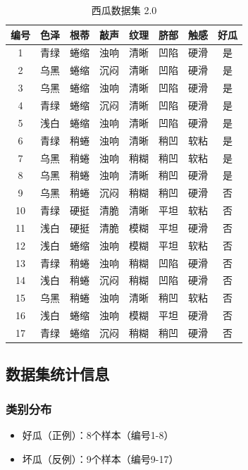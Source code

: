\documentclass[12pt,a4paper]{ctexart}
\begin{document}
\begin{table}[H]
\centering
\caption{西瓜数据集 2.0}
\begin{tabular}{cccccccc}
\toprule
\textbf{编号} & \textbf{色泽} & \textbf{根蒂} & \textbf{敲声} & \textbf{纹理} & \textbf{脐部} & \textbf{触感} & \textbf{好瓜} \\
\midrule
1 & 青绿 & 蜷缩 & 浊响 & 清晰 & 凹陷 & 硬滑 & 是 \\
2 & 乌黑 & 蜷缩 & 沉闷 & 清晰 & 凹陷 & 硬滑 & 是 \\
3 & 乌黑 & 蜷缩 & 浊响 & 清晰 & 凹陷 & 硬滑 & 是 \\
4 & 青绿 & 蜷缩 & 沉闷 & 清晰 & 凹陷 & 硬滑 & 是 \\
5 & 浅白 & 蜷缩 & 浊响 & 清晰 & 凹陷 & 硬滑 & 是 \\
6 & 青绿 & 稍蜷 & 浊响 & 清晰 & 稍凹 & 软粘 & 是 \\
7 & 乌黑 & 稍蜷 & 浊响 & 稍糊 & 稍凹 & 软粘 & 是 \\
8 & 乌黑 & 稍蜷 & 浊响 & 清晰 & 稍凹 & 硬滑 & 是 \\
9 & 乌黑 & 稍蜷 & 沉闷 & 稍糊 & 稍凹 & 硬滑 & 否 \\
10 & 青绿 & 硬挺 & 清脆 & 清晰 & 平坦 & 软粘 & 否 \\
11 & 浅白 & 硬挺 & 清脆 & 模糊 & 平坦 & 硬滑 & 否 \\
12 & 浅白 & 蜷缩 & 浊响 & 模糊 & 平坦 & 软粘 & 否 \\
13 & 青绿 & 稍蜷 & 浊响 & 稍糊 & 凹陷 & 硬滑 & 否 \\
14 & 浅白 & 稍蜷 & 沉闷 & 稍糊 & 凹陷 & 硬滑 & 否 \\
15 & 乌黑 & 稍蜷 & 浊响 & 清晰 & 稍凹 & 软粘 & 否 \\
16 & 浅白 & 蜷缩 & 浊响 & 模糊 & 平坦 & 硬滑 & 否 \\
17 & 青绿 & 蜷缩 & 沉闷 & 稍糊 & 稍凹 & 硬滑 & 否 \\
\bottomrule
\end{tabular}
\end{table}

\subsection{数据集统计信息}

\subsubsection{类别分布}
\begin{itemize}
    \item 好瓜（正例）：8个样本（编号1-8）
    \item 坏瓜（反例）：9个样本（编号9-17）
\end{itemize}
\end{document}
